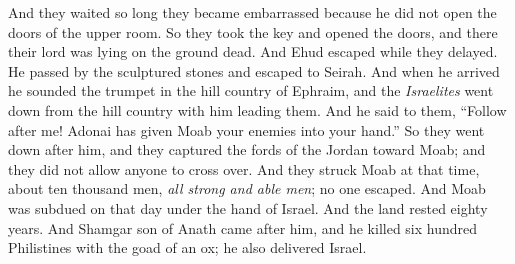 \begin{biblechapter}
\verse And they waited so long they became embarrassed because he did not open the doors of the upper room. So they took the key and opened the doors, and there their lord was lying on the ground dead.
\verse And Ehud escaped while they delayed. He passed by the sculptured stones and escaped to Seirah.
\verse And when he arrived he sounded the trumpet in the hill country of Ephraim, and the \textit{Israelites} went down from the hill country with him leading them.
\verse And he said to them, “Follow after me! Adonai has given Moab your enemies into your hand.” So they went down after him, and they captured the fords of the Jordan toward Moab; and they did not allow anyone to cross over.
\verse And they struck Moab at that time, about ten thousand men, \textit{all strong and able men}; no one escaped.
\verse And Moab was subdued on that day under the hand of Israel. And the land rested eighty years.
 And Shamgar son of Anath came after him, and he killed six hundred Philistines with the goad of an ox; he also delivered Israel.
\end{biblechapter}

